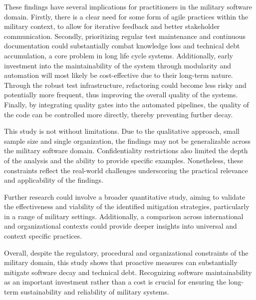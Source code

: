 These findings have several implications for practitioners in the military software domain. Firstly, there is a clear need for some form of agile practices within the military context, to allow for iterative feedback and better stakeholder communication.
Secondly, prioritizing regular test maintenance and continuous documentation could substantially combat knowledge loss and technical debt accumulation, a core problem in long life cycle systems.
Additionally, early investment into the maintainability of the system through modularity and automation will most likely be cost-effective due to their long-term nature.
Through the robust test infrastructure, refactoring could become less risky and potentially more frequent, thus improving the overall quality of the systems.
Finally, by integrating quality gates into the automated pipelines, the quality of the code can be controlled more directly, thereby preventing further decay.

This study is not without limitations. Due to the qualitative approach, small sample size and single organization, the findings may not be generalizable across the military software domain. Confidentiality restrictions also limited the depth of the analysis and the ability to provide specific examples.
Nonetheless, these constraints reflect the real-world challenges underscoring the practical relevance and applicability of the findings.

Further research could involve a broader quantitative study, aiming to validate the effectiveness and viability of the identified mitigation strategies, particularly in a range of military settings.
Additionally, a comparison across international and organizational contexts could provide deeper insights into universal and context specific practices.

Overall, despite the regulatory, procedural and organizational constraints of the military domain, this study shows that proactive measures can substantially mitigate software decay and technical debt.
Recognizing software maintainability as an important investment rather than a cost is crucial for ensuring the long-term sustainability and reliability of military systems.
